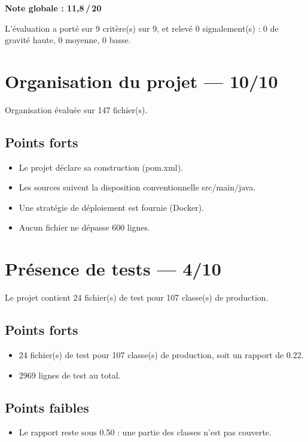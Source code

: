 \documentclass[11pt,a4paper]{article}
\begin{document}
\begin{center}
\Large\textbf{Note globale : 11,8\,/\,20}
\end{center}

L'évaluation a porté sur 9 critère(s) sur 9, et relevé 0 signalement(s) : 0 de gravité haute, 0 moyenne, 0 basse.

\section{Organisation du projet — 10/10}
Organisation évaluée sur 147 fichier(s).

\subsection*{Points forts}
\begin{itemize}
  \item Le projet déclare sa construction (pom.xml).
  \item Les sources suivent la disposition conventionnelle src/main/java.
  \item Une stratégie de déploiement est fournie (Docker).
  \item Aucun fichier ne dépasse 600 lignes.
\end{itemize}

\section{Présence de tests — 4/10}
Le projet contient 24 fichier(s) de test pour 107 classe(s) de production.

\subsection*{Points forts}
\begin{itemize}
  \item 24 fichier(s) de test pour 107 classe(s) de production, soit un rapport de 0.22.
  \item 2969 lignes de test au total.
\end{itemize}

\subsection*{Points faibles}
\begin{itemize}
  \item Le rapport reste sous 0.50 : une partie des classes n'est pas couverte.
\end{itemize}
\end{document}
